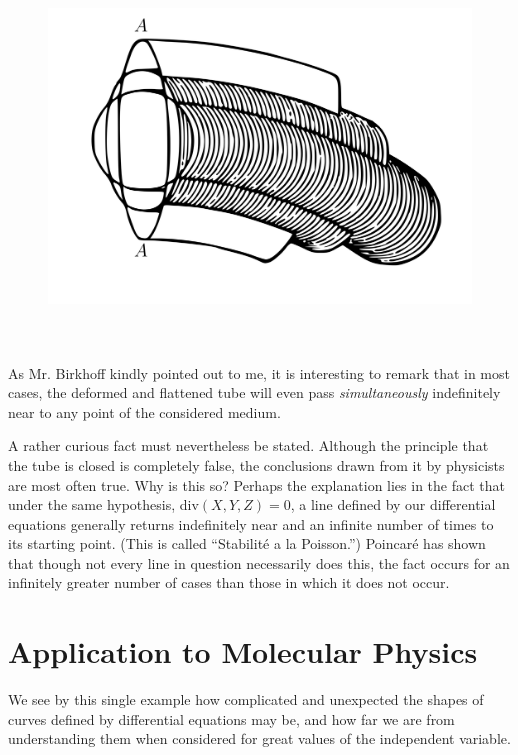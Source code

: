 \documentclass[12pt,oneside]{book}
\newcommand{\iit}[1]{\textit{#1}}
\begin{document}
\begin{figure}
    \centering
    \includegraphics[height=10cm]{Fig1.jpeg}
    \caption{}
    \label{Fig1}
\end{figure}

As Mr. Birkhoff kindly pointed out to me, it is interesting to remark that in
most cases, the deformed and flattened tube will even pass \iit{simultaneously}
indefinitely near to any point of the considered medium. \par

A rather curious fact must nevertheless be stated. Although the principle that
the tube is closed is completely false, the conclusions drawn from it by
physicists are most often true. Why is this so? Perhaps the explanation lies in
the fact that under the same hypothesis, div$(X,Y,Z)=0$, a line defined by our
differential equations generally returns indefinitely near and an infinite
number of times to its starting point. (This is called ``Stabilit\'e a la
Poisson.'') Poincar\'e has shown that though not every line in question
necessarily does this, the fact occurs for an infinitely greater number of cases
than those in which it does not occur. \par

\section{Application to Molecular Physics}
We see by this single example how complicated and unexpected the shapes of
curves defined by differential equations may be, and how far we are from
understanding them when considered for great values of the independent variable.
\par
\end{document}
